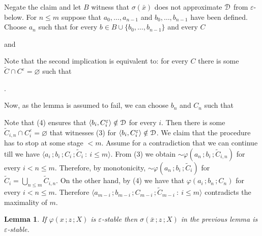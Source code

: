 \documentclass{amsproc}
\makeatletter
\newcounter{thm}
\theoremstyle{mio}
\newtheorem{lemma}[thm]{Lemma}\tcolorboxenvironment{lemma}{mythm}
\providecommand{\proofNameStyle}{\bfseries}
\renewenvironment{proof}[1][\proofname]{\par
  \pushQED{\qed}%
  \normalfont%
  \trivlist
  \item[\hskip\labelsep
        \proofNameStyle
    #1\@addpunct{.}]\ignorespaces
}{%
  \popQED\endtrivlist\@endpefalse
}
\makeatother
\begin{document}
\begin{proof}
  Negate the claim and let $B$ witness that $\sigma(\bar x)$ does not approximate ${\EuScript D}$ from $\varepsilon$-below.
  For $n\le m$ suppose that $a_0,\dots,a_{n-1}$ and $b_0,\dots,b_{n-1}$ have been defined.
  Choose $a_n$ such that for every $b\in B\cup\{b_0,\dots,b_{n-1}\}$ and every $C$

  \quad and

  
  Note that the second implication is equivalent to: for every $C$ there is some  $\tilde C\cap C^\varepsilon=\varnothing$ such that 
  
  .%

  Now, as the lemma is assumed to fail, we can choose $b_n$ and $C_n$ such that


  Note that (4) ensures that $\langle b_i,C_i^\varepsilon\rangle\notin{\EuScript D}$ for every $i$.
  Then there is some $\tilde C_{i,n}\cap C^\varepsilon_i=\varnothing$ that witnesses (3) for $\langle b_i,C_i^\varepsilon\rangle\notin{\EuScript D}$.
  We claim that the procedure has to stop at some stage $<m$. 
  Assume for a contradiction that we can continue till we have $\langle a_i\,;b_i\,;C_i\,;\tilde C_i\ :\ i\le m\rangle$.
  From (3) we obtain ${\sim}\varphi(a_n\,;b_i\,;\tilde C_{i,n})$ for every $i<n\le m$.
  Therefore, by monotonicity, ${\sim}\varphi(a_n\,;b_i\,;\tilde C_i)$ for $\tilde C_i=\bigcup_{n\le m}\tilde C_{i,n}$.
  On the other hand, by (4) we have that $\varphi(a_i\,;b_n\,;C_n)$ for every $i<n\le m$.
  Therefore $\langle a_{m-i}\,;b_{m-i}\,;C_{m-i}\,;\tilde C_{m-i}\ :\ i\le m\rangle$ contradicts the maximality of $m$.
\end{proof}

\begin{lemma}\label{lem_sigma_stable}
  If $\varphi(x\,;z\,;X)$ is $\varepsilon$-stable then $\sigma(\bar x\,;z\,;X)$ in the previous lemma is $\varepsilon$-stable.
\end{lemma}
\end{document}
